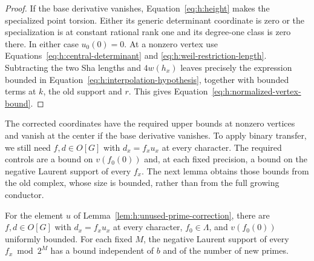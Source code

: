 \begin{proof}
If the base derivative vanishes, Equation~\eqref{eq:h:height} makes
the specialized point torsion. Either its generic determinant
coordinate is zero or the specialization is at constant rational
rank one and its degree-one class is zero there. In either case
$u_0(0)=0$. At a nonzero vertex use
Equations~\eqref{eq:h:central-determinant} and
\eqref{eq:h:weil-restriction-length}. Subtracting the two Sha lengths
and $4w(h_x)$ leaves precisely the expression bounded in
Equation~\eqref{eq:h:interpolation-hypothesis}, together with bounded
terms at $k$, the old support and $r$. This gives
Equation~\eqref{eq:h:normalized-vertex-bound}.
\end{proof}

The corrected coordinates have the required upper bounds at nonzero
vertices and vanish at the center if the base derivative vanishes.
To apply binary transfer, we still need $f,d\in O[G]$ with $d_x=f_xu_x$ at every character.
The required controls are a bound on $v(f_0(0))$ and, at each fixed
precision, a bound on the negative Laurent support of every $f_x$. The next lemma obtains those bounds from the
old complex, whose size is bounded, rather than from the full growing
conductor.

\begin{lemma}
\label{lem:h:family-clearing}
For the element $u$ of Lemma~\ref{lem:h:unused-prime-correction},
there are $f,d\in O[G]$ with $d_x=f_xu_x$ at every character,
$f_0\in\Lambda$, and $v(f_0(0))$ uniformly bounded. For each fixed
$M$, the negative Laurent support of every $f_x\bmod2^M$ has a
bound independent of $b$ and of the number of new primes.
\end{lemma}

